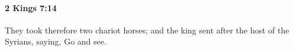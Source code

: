 
		\paragraph{2 Kings 7:14} %
			\label{2KINGS-7-14}

			They took therefore two chariot horses; and the king sent after the host of the Syrians, saying, Go and see.


